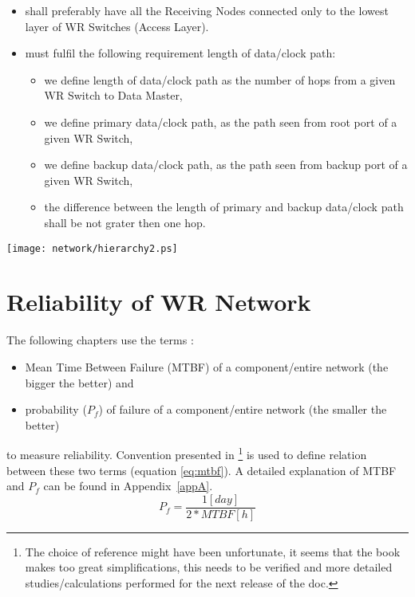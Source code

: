 \begin{itemize}
  \item shall preferably have all the Receiving Nodes connected only to the
	lowest layer of WR Switches (Access Layer).
  \item must fulfil the following requirement length of data/clock path: 
  \begin{itemize}
        \item we define length of data/clock path as the number of hops from a
	      given WR Switch to Data Master,	
        \item we define primary data/clock path, as the path seen from root
	      port of a given WR Switch,
        \item we define backup data/clock path, as the path seen from backup
	      port of a given WR Switch,
	\item the difference between the length of primary and backup data/clock
	      path shall be not grater then one hop.
  \end{itemize}
 
 \end{itemize}


\begin{center}
	\texttt{[image: network/hierarchy2.ps]}
	\label{fig:WRtopology}
\end{center}

\section{Reliability of WR Network}
\label{reliabilityOfNetwork}

The following chapters use the terms :
\begin{itemize}
  \item Mean Time Between Failure (MTBF) of a component/entire network (the
bigger the better) and
  \item probability ($P_f$) of failure of a component/entire network (the
smaller the better)
\end{itemize}
to measure reliability. Convention presented in \cite{DesigningLSLANs}
\footnote{The choice of reference might have been unfortunate, it seems that
the book makes too great simplifications, this needs to be verified and more
detailed studies/calculations performed for the next release of the doc.} is
used to define relation between these two terms (equation \ref{eq:mtbf}). A
detailed
explanation of MTBF and $P_f$ can be found in Appendix~\ref{appA}. 
	\begin{equation}
        \label{eq:mtbf}
		P_f= \frac{1 [day]}{2*MTBF [h]}  
	\end{equation}

